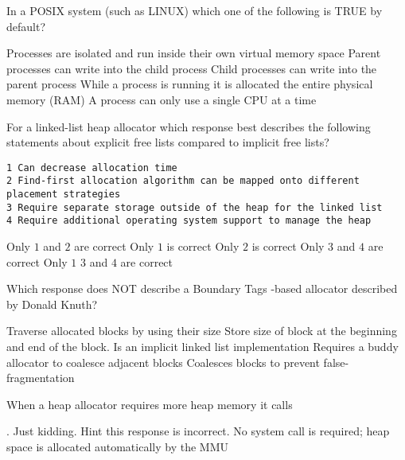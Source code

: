 \variant
In a POSIX system (such as LINUX) which one of the following is TRUE by default?
\begin{answers}
\correctanswer Processes are isolated and run inside their own virtual memory space
\answer Parent processes can write into the child process
\answer Child processes can write into the parent process
\answer While a process is running it is allocated the entire physical memory (RAM)
\answer A process can only use a single CPU at a time
\end{answers}
\begin{solution}
\end{solution}


\variant
For a linked-list heap allocator which response best describes the following statements about explicit free lists compared to implicit free lists?
\begin{verbatim}
1 Can decrease allocation time
2 Find-first allocation algorithm can be mapped onto different placement strategies
3 Require separate storage outside of the heap for the linked list
4 Require additional operating system support to manage the heap
\end{verbatim}
\begin{answers}
\correctanswer Only $1$ and $2$ are correct
\answer Only $1$ is correct
\answer Only $2$ is correct
\answer Only $3$ and $4$ are correct
\answer Only $1$ $3$ and $4$ are correct
\end{answers}
\begin{solution}
\end{solution}


\variant
Which response does NOT describe a Boundary Tags -based allocator described by Donald Knuth?
\begin{answers}
\answer Traverse allocated blocks by using their size
\answer Store size of block at the beginning and end of the block. 
\answer Is an implicit linked list implementation
\correctanswer Requires a buddy allocator to coalesce adjacent blocks
\answer Coalesces blocks to prevent false-fragmentation 
\end{answers}
\begin{solution}
\end{solution}

\variant
When a heap allocator requires more heap memory it calls
\begin{answers}
. Just kidding. Hint this response is incorrect.
\answer No system call is required; heap space is allocated automatically by the MMU
\end{answers}
\begin{solution}
\end{solution}




